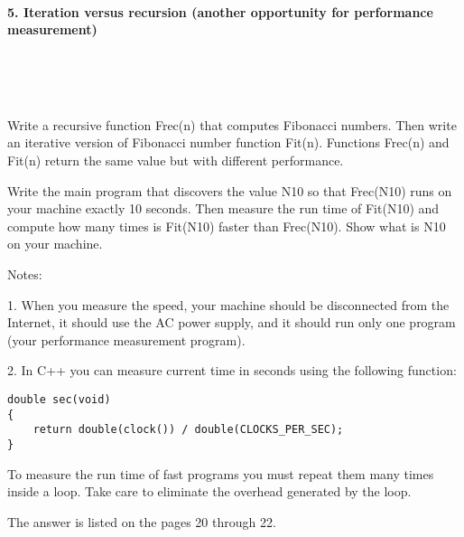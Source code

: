 \documentclass{article}
\begin{document}
\paragraph{}\

	
	\rmfamily
	
	\paragraph{5. Iteration versus recursion (another opportunity for performance measurement) }\
	
	\rmfamily\
	
		Write a recursive function Frec(n) that computes Fibonacci numbers. Then write an iterative version of Fibonacci number function Fit(n). Functions Frec(n) and Fit(n) return the same value but with different performance.
		\newline
		
		Write the main program that discovers the value N10 so that Frec(N10) runs on your machine exactly 10 seconds. Then measure the run time of Fit(N10) and compute how many times is Fit(N10) faster than Frec(N10). Show what is N10 on your machine.
		\newline
		
		\noindent Notes:
		
		1. When you measure the speed, your machine should be disconnected from the Internet, it should use the AC power supply, and it should run only one program (your performance measurement program).
		
		2. In C++ you can measure current time in seconds using the following function:
		
		\begin{verbatim}
double sec(void)
{
    return double(clock()) / double(CLOCKS_PER_SEC);
}
		\end{verbatim}
		
		To measure the run time of fast programs you must repeat them many times inside a loop. Take care to eliminate the overhead generated by the loop.
		\newline
		
		The answer is listed on the pages 20 through 22.

\paragraph{}\
\paragraph{}\
\end{document}
